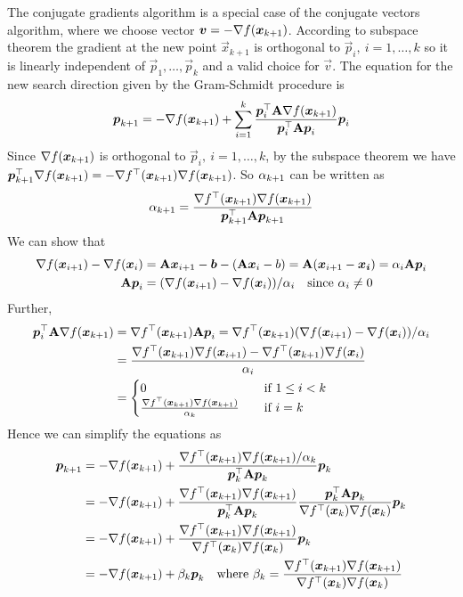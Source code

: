 The conjugate gradients algorithm is a special case of the conjugate vectors algorithm, where we choose vector $\boldsymbol{v}=-\nabla f(\boldsymbol{x}_{k+1})$. According to subspace theorem the gradient at the new point $\vec{x}_{k+1}$ is orthogonal to $\vec{p}_i,\ i=1,\dotsc,k$ so it is linearly independent of $\vec{p}_1,\dotsc,\vec{p}_k$ and a valid choice for $\vec{v}$. The equation for the new search direction given by the Gram-Schmidt procedure is
\begin{align*}
	\boldsymbol{p}_{k+1}=-\nabla f(\boldsymbol{x}_{k+1})+\sum_{i=1}^k\frac{\boldsymbol{p}_i^\top\mathbf{A}\nabla f(\boldsymbol{x}_{k+1})}{\boldsymbol{p}_i^\top\mathbf{A}\boldsymbol{p}_i}\boldsymbol{p}_i
\end{align*}
Since $\nabla f(\boldsymbol{x}_{k+1})$ is orthogonal to $\vec{p}_i,\ i=1,\dotsc,k$, by the subspace theorem we have $\boldsymbol{p}_{k+1}^\top\nabla f(\boldsymbol{x}_{k+1})=-\nabla f^\top(\boldsymbol{x}_{k+1})\nabla f(\boldsymbol{x}_{k+1})$. So $\alpha_{k+1}$ can be written as
\begin{align*}
	\alpha_{k+1}=\frac{\nabla f^\top(\boldsymbol{x}_{k+1})\nabla f(\boldsymbol{x}_{k+1})}{\boldsymbol{p}_{k+1}^\top\mathbf{A}\boldsymbol{p}_{k+1}}
\end{align*}
We can show that
\begin{align*}
	\nabla f(\boldsymbol{x}_{i+1})-\nabla f(\boldsymbol{x}_i)&=\mathbf{A}\boldsymbol{x}_{i+1}-\boldsymbol{b}-(\mathbf{A}\boldsymbol{x}_i-b)=\mathbf{A}(\boldsymbol{x}_{i+1}-\boldsymbol{x_i})=\alpha_i\mathbf{A}\boldsymbol{p}_i \\
	\mathbf{A}\boldsymbol{p}_i&=(\nabla f(\boldsymbol{x}_{i+1})-\nabla f(\boldsymbol{x}_i))/\alpha_i\quad\text{since}\ \alpha_i\neq0
\end{align*}
Further,
\begin{align*}
	\vec{p}_i\TT\mat{A}\grad f(\vec{x}_{k+1})&=\grad f\TT(\vec{x}_{k+1})\mat{A}\vec{p}_i=\grad f\TT(\vec{x}_{k+1})\pfrac{(\grad f(\vec{x}_{i+1})-\grad f(\vec{x}_i))}{\al_i} \\
	&=\frac{\grad f\TT(\vec{x}_{k+1})\grad f(\vec{x}_{i+1})-\grad f\TT(\vec{x}_{k+1})\grad f(\vec{x}_i)}{\al_i} \\
	&=\casefill{0&\quad\text{if}\ 1\leq i<k \\ \frac{\grad f\TT(\vec{x}_{k+1})\grad f(\vec{x}_{k+1})}{\al_k}&\quad\text{if}\ i=k}
\end{align*}
Hence we can simplify the equations as
\begin{align*}
	\vec{p}_{k+1}&=-\grad f(\vec{x}_{k+1})+\frac{\pfrac{\grad f\TT(\vec{x}_{k+1})\grad f(\vec{x}_{k+1})}{\al_k}}{\vec{p}_k\TT\mat{A}\vec{p}_k}\vec{p}_k \\
	&=-\grad f(\vec{x}_{k+1})+\frac{\grad f\TT(\vec{x}_{k+1})\grad f(\vec{x}_{k+1})}{\vec{p}_k\TT\mat{A}\vec{p}_k}\frac{\vec{p}_k\TT\mat{A}\vec{p}_k}{\grad f\TT(\vec{x}_k)\grad f(\vec{x}_k)}\vec{p}_k \\
	&=-\grad f(\vec{x}_{k+1})+\frac{\grad f\TT(\vec{x}_{k+1})\grad f(\vec{x}_{k+1})}{\grad f\TT(\vec{x}_k)\grad f(\vec{x}_k)}\vec{p}_k \\
	&=-\grad f(\vec{x}_{k+1})+\be_k\vec{p}_k\quad\text{where}\ \be_k=\frac{\grad f\TT(\vec{x}_{k+1})\grad f(\vec{x}_{k+1})}{\grad f\TT(\vec{x}_k)\grad f(\vec{x}_k)}
\end{align*}
